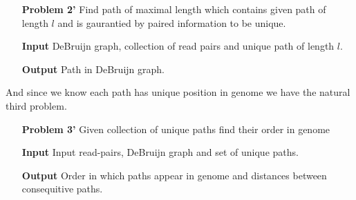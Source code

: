 \documentclass[a4paper,10pt]{article}
\begin{document}
\smallskip
\begin{itemize}
\item[\bf Problem 2'] Find path of maximal length which contains given path of length $l$ and is gaurantied by paired information to be unique.
\item[\bf Input] DeBruijn graph, collection of read pairs and unique path of length $l$.
\item[\bf Output] Path in DeBruijn graph.
\end{itemize}

And since we know each path has unique position in genome we have the natural third problem.

\begin{itemize}
\item[\bf Problem 3'] Given collection of unique paths find their order in genome
\item[\bf Input] Input read-pairs, DeBruijn graph and set of unique paths.
\item[\bf Output] Order in which paths appear in genome and distances between consequitive paths.
\end{itemize}
\end{document}
